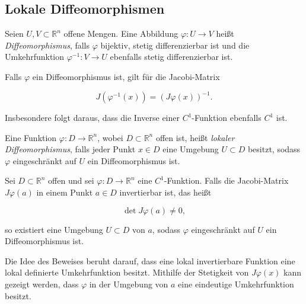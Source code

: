 \subsection{Lokale Diffeomorphismen}

\begin{definition}{}
Seien $ U, V \subset \mathbb{R}^n $ offene Mengen. Eine Abbildung $ \varphi: U \to V $ heißt \emph{Diffeomorphismus}, falls $ \varphi $ bijektiv, stetig differenzierbar ist und die Umkehrfunktion $ \varphi^{-1}: V \to U $ ebenfalls stetig differenzierbar ist.
\end{definition}

\begin{bemerkungbox}
Falls $ \varphi $ ein Diffeomorphismus ist, gilt für die Jacobi-Matrix


$$
J(\varphi^{-1}(x)) = (J\varphi(x))^{-1}.
$$


Insbesondere folgt daraus, dass die Inverse einer $ C^1 $-Funktion ebenfalls $ C^1 $ ist.
\end{bemerkungbox}

\begin{definition}{}
Eine Funktion $ \varphi: D \to \mathbb{R}^n $, wobei $ D \subset \mathbb{R}^n $ offen ist, heißt \emph{lokaler Diffeomorphismus}, falls jeder Punkt $ x \in D $ eine Umgebung $ U \subset D $ besitzt, sodass $ \varphi $ eingeschränkt auf $ U $ ein Diffeomorphismus ist.
\end{definition}

\begin{satz}{}
Sei $ D \subset \mathbb{R}^n $ offen und sei $ \varphi: D \to \mathbb{R}^n $ eine $ C^1 $-Funktion. Falls die Jacobi-Matrix $ J\varphi(a) $ in einem Punkt $ a \in D $ invertierbar ist, das heißt


$$
\det J\varphi(a) \neq 0,
$$


so existiert eine Umgebung $ U \subset D $ von $ a $, sodass $ \varphi $ eingeschränkt auf $ U $ ein Diffeomorphismus ist.
\end{satz}

\begin{beweisbox}
Die Idee des Beweises beruht darauf, dass eine lokal invertierbare Funktion eine lokal definierte Umkehrfunktion besitzt. Mithilfe der Stetigkeit von $ J\varphi(x) $ kann gezeigt werden, dass $ \varphi $ in der Umgebung von $ a $ eine eindeutige Umkehrfunktion besitzt.
\end{beweisbox}



